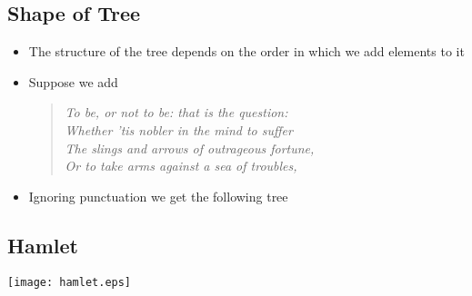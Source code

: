 \begin{slide}
\section{Shape of Tree}

\begin{PauseHighLight}
  \begin{itemize}
  \item The structure of the tree depends on the order in which we add
    elements to it\pause
  \item Suppose we add
    \begin{quote}\it
      To be, or not to be: that is the question:\\
      Whether 'tis nobler in the mind to suffer\\
      The slings and arrows of outrageous fortune,\\
      Or to take arms against a sea of troubles,\pause
    \end{quote}
  \item Ignoring punctuation we get the following tree\pause
  \end{itemize}
\end{PauseHighLight}

\end{slide}


\begin{slide}
\section{Hamlet}

\begin{center}
  \texttt{[image: hamlet.eps]}
\end{center}
\end{slide}



\Outline %


